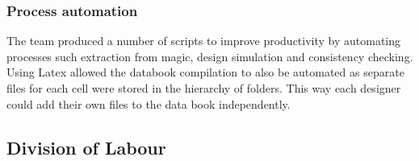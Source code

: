 \subsubsection{Process automation}
The team produced a number of scripts to improve productivity by automating processes such extraction from magic, design simulation and consistency checking.
Using Latex allowed the databook compilation to also be automated as separate files for each cell were stored in the hierarchy of folders.   
This way each designer could add their own files to the data book independently.



\clearpage
\subsection{Division of Labour}
